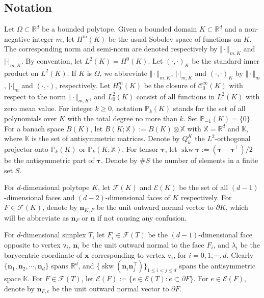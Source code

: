 \documentclass[10pt]{amsart}
\newcommand{\skw}{\operatorname{skw}}
\numberwithin{equation}{section}
\begin{document}
\subsection{Notation}
Let $\Omega\subset \mathbb{R}^d$ be a bounded
polytope. Given a bounded domain $K\subset\mathbb{R}^{d}$ and a
non-negative integer $m$, let $H^m(K)$ be the usual Sobolev space of functions
on $K$.
The corresponding norm and semi-norm are denoted respectively by
$\Vert\cdot\Vert_{m,K}$ and $|\cdot|_{m,K}$. By convention, let $L^2(K)=H^0(K)$. 
Let $(\cdot, \cdot)_K$ be the standard inner product on $L^2(K)$. If $K$ is $\Omega$, we abbreviate
$\Vert\cdot\Vert_{m,K}$, $|\cdot|_{m,K}$ and $(\cdot, \cdot)_K$ by $\Vert\cdot\Vert_{m}$, $|\cdot|_{m}$ and $(\cdot, \cdot)$,
respectively. Let $H_0^m(K)$ be the closure of $\mathcal C_{0}^{\infty}(K)$ with
respect to the norm $\Vert\cdot\Vert_{m,K}$, and $L_0^2(K)$ consist of all functions in $L^2(K)$ with zero mean value.
For integer $k\geq0$,
notation $\mathbb P_k(K)$ stands for the set of all
polynomials over $K$ with the total degree no more than $k$. Set $\mathbb P_{-1}(K)=\{0\}$.
For a banach space $B(K)$, let $B(K; \mathbb{X}):=B(K)\otimes\mathbb{X}$ with $\mathbb{X}=\mathbb{R}^d$ and $\mathbb{K}$, where $\mathbb{K}$ is the set of antisymmetric matrices.
Denote by $Q_k^{K}$ the $L^2$-orthogonal projector onto $\mathbb P_k(K)$ or $\mathbb P_{k}(K; \mathbb{X})$.
For tensor $\boldsymbol{\tau}$, let $\skw\boldsymbol{\tau}:=(\boldsymbol{\tau}-\boldsymbol{\tau}^{\intercal})/2$ be the antisymmetric part of $\boldsymbol{\tau}$.
Denote by $\#S$ the number of elements in a finite set $S$.

For $d$-dimensional polytope $K$, let $\mathcal{F}(K)$ and $\mathcal{E}(K)$ be the set of all $(d-1)$-dimensional faces and $(d-2)$-dimensional faces of $K$ respectively. For $F\in\mathcal{F}(K)$, denote by $\boldsymbol{n}_{K,F}$ be the unit outward normal vector to $\partial K$, which will be abbreviate as $\boldsymbol{n}_F$ or $\boldsymbol{n}$ if not causing any confusion.

For $d$-dimensional simplex $T$,
let $F_i\in\mathcal F(T)$ be the $(d-1)$-dimensional face opposite to vertex $\texttt{v}_i$, $\boldsymbol n_i$ be the unit outward normal to the face $F_i$, and $\lambda_i$ be the barycentric coordinate of $\boldsymbol x$ corresponding to vertex $\texttt{v}_i$, for $i=0, 1, \cdots, d$.
Clearly $\{ \boldsymbol n_1, \boldsymbol n_2, \cdots, \boldsymbol n_d \}$ spans $\mathbb R^d$, and $\{\skw({\boldsymbol n_i\boldsymbol n_j^{\intercal}})\}_{1\leq i<j\leq d}$ spans the antisymmetric space $\mathbb K$. 
For $F\in\mathcal F(T)$, let $\mathcal{E}(F):=\{e\in\mathcal{E}(T): e\subset\partial F\}$.
For $e\in \mathcal E(F)$, denote by $\boldsymbol{n}_{F,e}$ be the unit outward normal vector to $\partial F$.
\end{document}
